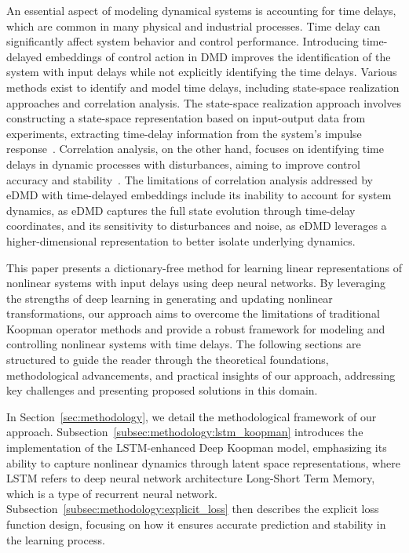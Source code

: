 \documentclass[conference]{IEEEtran}
\begin{document}
An essential aspect of modeling dynamical systems is accounting for time delays, which are common in many physical and industrial processes. Time delay can significantly affect system behavior and control performance. Introducing time-delayed embeddings of control action in DMD improves the identification of the system with input delays while not explicitly identifying the time delays. Various methods exist to identify and model time delays, including state-space realization approaches and correlation analysis. The state-space realization approach involves constructing a state-space representation based on input-output data from experiments, extracting time-delay information from the system's impulse response~\cite{Lima2015254}. Correlation analysis, on the other hand, focuses on identifying time delays in dynamic processes with disturbances, aiming to improve control accuracy and stability~\cite{Li201792}. The limitations of correlation analysis addressed by eDMD with time-delayed embeddings include its inability to account for system dynamics, as eDMD captures the full state evolution through time-delay coordinates, and its sensitivity to disturbances and noise, as eDMD leverages a higher-dimensional representation to better isolate underlying dynamics.

This paper presents a dictionary-free method for learning linear representations of nonlinear systems with input delays using deep neural networks. By leveraging the strengths of deep learning in generating and updating nonlinear transformations, our approach aims to overcome the limitations of traditional Koopman operator methods and provide a robust framework for modeling and controlling nonlinear systems with time delays. The following sections are structured to guide the reader through the theoretical foundations, methodological advancements, and practical insights of our approach, addressing key challenges and presenting proposed solutions in this domain.

In Section~\ref{sec:methodology}, we detail the methodological framework of our approach. Subsection~\ref{subsec:methodology:lstm_koopman} introduces the implementation of the LSTM-enhanced Deep Koopman model, emphasizing its ability to capture nonlinear dynamics through latent space representations, where LSTM refers to deep neural network architecture Long-Short Term Memory, which is a type of recurrent neural network. Subsection~\ref{subsec:methodology:explicit_loss} then describes the explicit loss function design, focusing on how it ensures accurate prediction and stability in the learning process.
\end{document}
